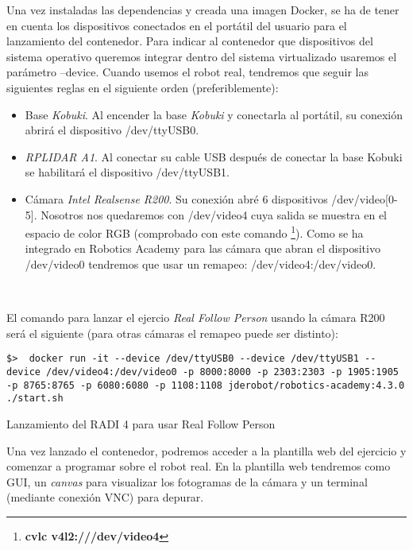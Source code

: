 Una vez instaladas las dependencias y creada una imagen Docker, se ha de tener en cuenta los dispositivos conectados en el portátil del usuario para el lanzamiento del contenedor. Para indicar al contenedor que dispositivos del sistema operativo queremos integrar dentro del sistema virtualizado usaremos el parámetro --device. Cuando usemos el robot real, tendremos que seguir las siguientes reglas en el siguiente orden (preferiblemente):

\begin{itemize}
	\item Base \textit{Kobuki}. Al encender la base \textit{Kobuki} y conectarla al portátil, su conexión abrirá el dispositivo /dev/ttyUSB0.
	\item \textit{RPLIDAR A1}. Al conectar su cable USB después de conectar la base Kobuki se habilitará el dispositivo /dev/ttyUSB1.
	\item Cámara \textit{Intel Realsense R200}. Su conexión abré 6 dispositivos /dev/video[0-5]. Nosotros nos quedaremos con /dev/video4 cuya salida se muestra en el espacio de color RGB (comprobado con este comando \footnote{\textbf{cvlc v4l2:///dev/video4}}). Como se ha integrado en Robotics Academy para las cámara que abran el dispositivo /dev/video0 tendremos que usar un remapeo: /dev/video4:/dev/video0.
\end{itemize}\

El comando para lanzar el ejercio \textit{Real Follow Person} usando la cámara R200 será el siguiente (para otras cámaras el remapeo puede ser distinto):\\

\begin{code}[H]
\begin{lstlisting}
$>  docker run -it --device /dev/ttyUSB0 --device /dev/ttyUSB1 --device /dev/video4:/dev/video0 -p 8000:8000 -p 2303:2303 -p 1905:1905 -p 8765:8765 -p 6080:6080 -p 1108:1108 jderobot/robotics-academy:4.3.0 ./start.sh
\end{lstlisting}
\caption{Lanzamiento del RADI 4 para usar Real Follow Person}
\label{cod:lanzamiento_radi_real_follow_person}
\end{code}

Una vez lanzado el contenedor, podremos acceder a la plantilla web del ejercicio y comenzar a programar sobre el robot real. En la plantilla web tendremos como GUI, un \textit{canvas} para visualizar los fotogramas de la cámara y un terminal (mediante conexión VNC) para depurar.





